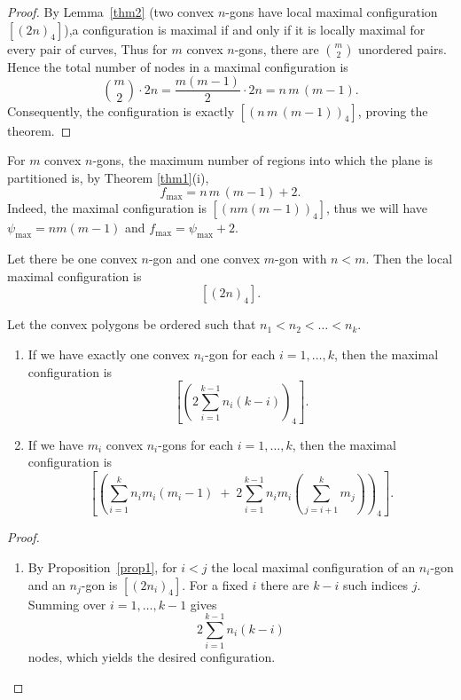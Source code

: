 \documentclass[article,11pt]{amsart} \numberwithin{equation}{section}
\numberwithin{equation}{section}
\begin{document}
{\begin{proof}
By Lemma~\ref{thm2} (two convex $n$-gons have local maximal configuration $[(2n)_4]$),a configuration is maximal if and only if it is locally maximal for every pair of curves, Thus for $m$ convex $n$-gons, there are $\binom{m}{2}$ unordered pairs.  Hence the total number of nodes in a maximal configuration is
\[
\binom{m}{2} \cdot 2n = \frac{m(m-1)}{2} \cdot 2n = n\,m\,(m-1).
\]
Consequently, the configuration is exactly $[(n\,m\,(m-1))_4]$, proving the theorem.
\end{proof}

\begin{cor}
For $m$ convex $n$-gons, the maximum number of regions into which the plane is partitioned is, by Theorem \ref{thm1}(i),
\[
f_{\max} = n\,m\,(m-1) + 2.
\]
Indeed, the maximal configuration is $[(n m (m-1))_4]$, thus we will have $\psi_{\max} = n m (m-1)$ and $f_{\max} = \psi_{\max} + 2$.
\end{cor}

\begin{inp}\label{prop1}
Let there be one convex $n$-gon and one convex $m$-gon with $n < m$. Then the local maximal configuration is
\[
[(2n)_4].
\]
\end{inp}

\begin{thm}\label{thm3}
Let the convex polygons be ordered such that $n_1 < n_2 < \dots < n_k$.

\begin{enumerate}
	\item[(i)] If we have exactly one convex $n_i$-gon for each $i = 1,\dots,k$, then the maximal configuration is
	\[
	\left[ \left( 2\sum_{i=1}^{k-1} n_i (k-i) \right)_4 \right].
	\]
	
	\item[(ii)] If we have $m_i$ convex $n_i$-gons for each $i = 1,\dots,k$, then the maximal configuration is
	\[
	\left[ \left( \sum_{i=1}^{k} n_i m_i (m_i-1) \;+\; 2\sum_{i=1}^{k-1} n_i m_i \left( \sum_{j=i+1}^{k} m_j \right) \right)_4 \right].
	\]
\end{enumerate}
\end{thm}

\begin{proof}
\begin{enumerate}
	\item[(i)]	
By Proposition~\ref{prop1}, for $i<j$ the local maximal configuration of an $n_i$-gon and an $n_j$-gon is $[(2n_i)_4]$.  
For a fixed $i$ there are $k-i$ such indices $j$.  Summing over $i=1,\dots,k-1$ gives
\[
2\sum_{i=1}^{k-1} n_i(k-i)
\]
nodes, which yields the desired configuration.
	

\end{enumerate}
\end{proof}}
\end{document}
